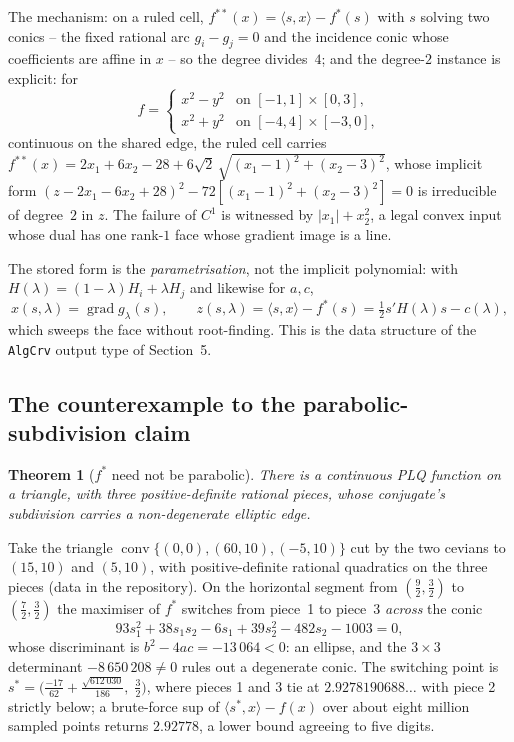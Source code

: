 \documentclass[11pt]{article}
\newtheorem{theorem}{Theorem}
\theoremstyle{definition}
\begin{document}
The mechanism:
on a ruled cell,
$f^{**}(x)=\langle s,x\rangle-f^*(s)$ with $s$ solving two conics -- the fixed
rational arc $g_i-g_j=0$ and the incidence conic whose coefficients are affine
in $x$ -- so the degree divides~$4$; and the degree-$2$ instance is explicit:
for
\[
 f = \begin{cases} x^2-y^2 & \text{on } [-1,1]\times[0,3],\\
                   x^2+y^2 & \text{on } [-4,4]\times[-3,0],\end{cases}
\]
continuous on the shared edge, the ruled cell carries
$f^{**}(x)=2x_1+6x_2-28+6\sqrt2\,\sqrt{(x_1-1)^2+(x_2-3)^2}$, whose implicit
form $(z-2x_1-6x_2+28)^2-72[(x_1-1)^2+(x_2-3)^2]=0$ is irreducible of
degree~$2$ in $z$.
The failure of $C^1$ is witnessed by $|x_1|+x_2^2$, a legal convex input whose
dual has one rank-$1$ face whose gradient image is a line.

The stored form is the \emph{parametrisation}, not the implicit polynomial:
with $H(\lambda)=(1-\lambda)H_i+\lambda H_j$ and likewise for $a,c$,
\[
 x(s,\lambda)=\operatorname{grad} g_\lambda(s),\qquad
 z(s,\lambda)=\langle s,x\rangle-f^*(s)=\tfrac12 s'H(\lambda)s-c(\lambda),
\]
which sweeps the face without root-finding.
 This is the data
structure of the \texttt{AlgCrv} output type of Section~5.

\subsection{The counterexample to the parabolic-subdivision claim}

\begin{theorem}[$f^*$ need not be parabolic]\label{thm:counter}
There is a continuous PLQ function on a triangle, with three positive-definite
rational pieces, whose conjugate's subdivision carries a non-degenerate
\emph{elliptic} edge.
\end{theorem}

Take the triangle $\operatorname{conv}\{(0,0),(60,10),(-5,10)\}$ cut by the
two cevians to $(15,10)$ and $(5,10)$, with positive-definite rational
quadratics on the three pieces (data in the repository). On the horizontal
segment from $(\tfrac92,\tfrac32)$ to $(\tfrac72,\tfrac32)$ the maximiser of
$f^*$ switches from piece~1 to piece~3 \emph{across} the conic
\[
 93s_1^2+38s_1s_2-6s_1+39s_2^2-482s_2-1003=0,
\]
whose discriminant is $b^2-4ac=-13\,064<0$: an ellipse, and the $3\times3$
determinant $-8\,650\,208\ne0$ rules out a degenerate conic.
 The switching
point is $s^*=\bigl(\frac{-17}{62}+\frac{\sqrt{612\,030}}{186},\;\frac32\bigr)$,
where pieces 1 and 3 tie at $2.9278190688\ldots$ with piece 2 strictly below; a
brute-force sup of $\langle s^*,x\rangle-f(x)$ over about eight million sampled
points returns $2.92778$, a lower bound agreeing to five digits.
\end{document}
